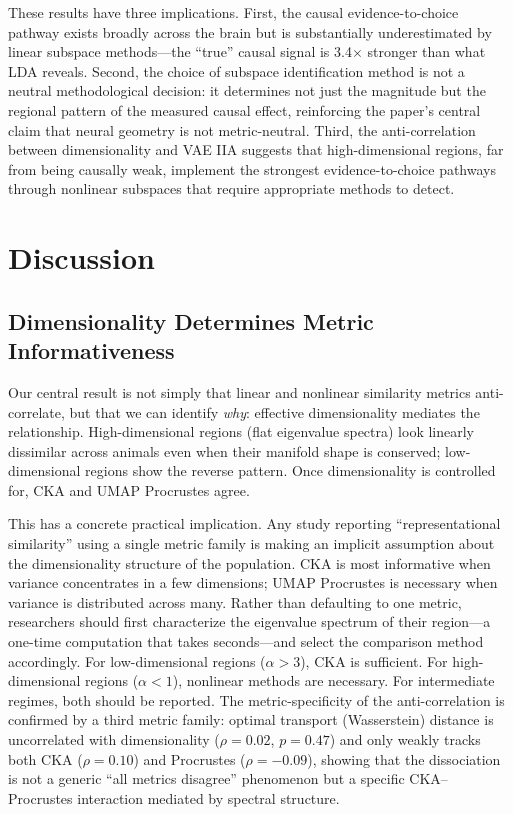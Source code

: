 \documentclass{article}
\begin{document}
These results have three implications. First, the causal evidence-to-choice pathway exists broadly across the brain but is substantially underestimated by linear subspace methods---the ``true'' causal signal is 3.4$\times$ stronger than what LDA reveals. Second, the choice of subspace identification method is not a neutral methodological decision: it determines not just the magnitude but the regional pattern of the measured causal effect, reinforcing the paper's central claim that neural geometry is not metric-neutral. Third, the anti-correlation between dimensionality and VAE IIA suggests that high-dimensional regions, far from being causally weak, implement the strongest evidence-to-choice pathways through nonlinear subspaces that require appropriate methods to detect.

\section{Discussion}

\subsection{Dimensionality Determines Metric Informativeness}

Our central result is not simply that linear and nonlinear similarity metrics anti-correlate, but that we can identify \emph{why}: effective dimensionality mediates the relationship. High-dimensional regions (flat eigenvalue spectra) look linearly dissimilar across animals even when their manifold shape is conserved; low-dimensional regions show the reverse pattern. Once dimensionality is controlled for, CKA and UMAP Procrustes agree.

This has a concrete practical implication. Any study reporting ``representational similarity'' using a single metric family is making an implicit assumption about the dimensionality structure of the population. CKA is most informative when variance concentrates in a few dimensions; UMAP Procrustes is necessary when variance is distributed across many. Rather than defaulting to one metric, researchers should first characterize the eigenvalue spectrum of their region---a one-time computation that takes seconds---and select the comparison method accordingly. For low-dimensional regions ($\alpha > 3$), CKA is sufficient. For high-dimensional regions ($\alpha < 1$), nonlinear methods are necessary. For intermediate regimes, both should be reported. The metric-specificity of the anti-correlation is confirmed by a third metric family: optimal transport (Wasserstein) distance is uncorrelated with dimensionality ($\rho = 0.02$, $p = 0.47$) and only weakly tracks both CKA ($\rho = 0.10$) and Procrustes ($\rho = -0.09$), showing that the dissociation is not a generic ``all metrics disagree'' phenomenon but a specific CKA--Procrustes interaction mediated by spectral structure.
\end{document}
